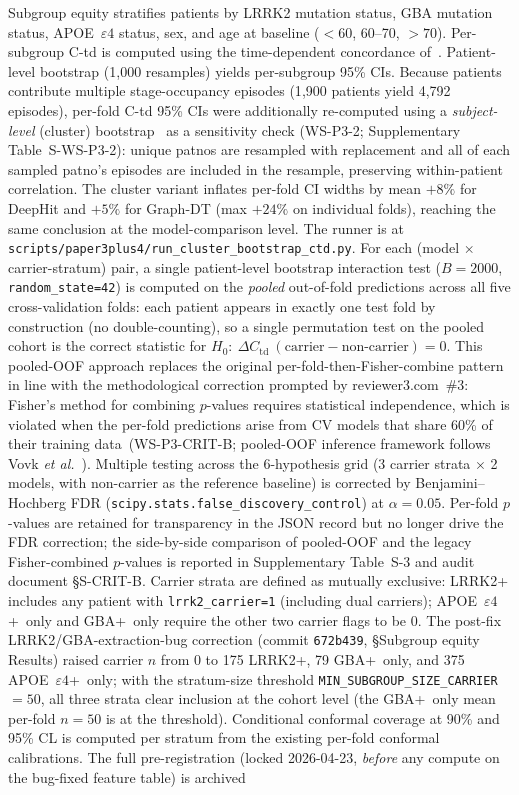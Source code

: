 \documentclass[11pt]{article}
\begin{document}
Subgroup equity stratifies patients by LRRK2 mutation status, GBA mutation status, APOE~$\varepsilon4$ status, sex, and age at baseline ($<60$, 60--70, $>70$). Per-subgroup C-td is computed using the time-dependent concordance of~\cite{uno2007evaluating}. Patient-level bootstrap (1{,}000 resamples) yields per-subgroup 95\% CIs. Because patients contribute multiple stage-occupancy episodes (1{,}900 patients yield 4{,}792 episodes), per-fold C-td 95\% CIs were additionally re-computed using a \emph{subject-level} (cluster) bootstrap~\cite{davison1997bootstrap,field2007bootstrap} as a sensitivity check (WS-P3-2; Supplementary Table~S-WS-P3-2): unique patnos are resampled with replacement and all of each sampled patno's episodes are included in the resample, preserving within-patient correlation. The cluster variant inflates per-fold CI widths by mean $+8\%$ for DeepHit and $+5\%$ for Graph-DT (max $+24\%$ on individual folds), reaching the same conclusion at the model-comparison level. The runner is at \texttt{scripts/paper3plus4/run\_cluster\_bootstrap\_ctd.py}. For each (model $\times$ carrier-stratum) pair, a single patient-level bootstrap interaction test ($B{=}2000$, \texttt{random\_state=42}) is computed on the \emph{pooled} out-of-fold predictions across all five cross-validation folds: each patient appears in exactly one test fold by construction (no double-counting), so a single permutation test on the pooled cohort is the correct statistic for $H_0:\ \Delta C_\mathrm{td}~(\text{carrier} - \text{non-carrier}) = 0$. This pooled-OOF approach replaces the original per-fold-then-Fisher-combine pattern in line with the methodological correction prompted by reviewer3.com~\#3: Fisher's method for combining $p$-values requires statistical independence, which is violated when the per-fold predictions arise from CV models that share 60\% of their training data~(WS-P3-CRIT-B; pooled-OOF inference framework follows Vovk \emph{et al.}~\cite{vovk2022conformal}). Multiple testing across the 6-hypothesis grid (3 carrier strata $\times$ 2 models, with non-carrier as the reference baseline) is corrected by Benjamini--Hochberg FDR (\texttt{scipy.stats.false\_discovery\_control}) at $\alpha{=}0.05$. Per-fold $p$-values are retained for transparency in the JSON record but no longer drive the FDR correction; the side-by-side comparison of pooled-OOF and the legacy Fisher-combined $p$-values is reported in Supplementary Table~S-3 and audit document \S S-CRIT-B. Carrier strata are defined as mutually exclusive: LRRK2+ includes any patient with \texttt{lrrk2\_carrier=1} (including dual carriers); APOE~$\varepsilon4$+~only and GBA+~only require the other two carrier flags to be 0. The post-fix LRRK2/GBA-extraction-bug correction (commit \texttt{672b439}, \S Subgroup equity Results) raised carrier $n$ from 0 to 175 LRRK2+, 79 GBA+~only, and 375 APOE~$\varepsilon4$+~only; with the stratum-size threshold \texttt{MIN\_SUBGROUP\_SIZE\_CARRIER}~$=50$, all three strata clear inclusion at the cohort level (the GBA+~only mean per-fold $n{=}50$ is at the threshold). Conditional conformal coverage at 90\% and 95\% CL is computed per stratum from the existing per-fold conformal calibrations. The full pre-registration (locked 2026-04-23, \emph{before} any compute on the bug-fixed feature table) is archived 
\end{document}
